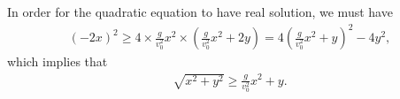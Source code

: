 \documentclass{article}
\begin{document}
\begin{enumerate}
In order for the quadratic equation to have real solution, we must have
\begin{align*}
 (-2x) ^2 \geq 4 \times \frac{g}{v_0^2}x^2 \times \left(\frac{g}{v_0^2}x^2+2y\right) = 4\left(\frac{g}{v_0^2}x^2+y\right)^2-4y^2,
\end{align*}
which implies that
\begin{align*}
 \sqrt{ x^2+y^2 }\geq \frac{g}{v_0^2}x^2+y.
\end{align*}



\end{enumerate}
\end{document}
